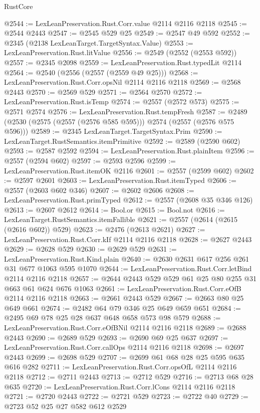 \begin{lexlean}{RustCore}
\begin{coremodule}
@2544 := LexLeanPreservation.Rust.Corr.value @2114 @2116 @2118
@2545 := @2544 @2443
@2547 := @2545 @529 @25
@2549 := @2547 @49 @592
@2552 := @2345 (@2138 LexLeanTarget.TargetSyntax.Value)
@2553 := LexLeanPreservation.Rust.litValue
@2556 := @2549 (@2552 (@2553 @592))
@2557 := @2345 @2098
@2559 := LexLeanPreservation.Rust.typedLit @2114
@2564 := @2540 (@2556 (@2557 (@2559 @49 @25)))
@2568 := LexLeanPreservation.Rust.Corr.opsNil @2114 @2116 @2118
@2569 := @2568 @2443
@2570 := @2569 @529
@2571 := @2564 @2570
@2572 := LexLeanPreservation.Rust.isTemp
@2574 := @2557 (@2572 @573)
@2575 := @2571 @2574
@2576 := LexLeanPreservation.Rust.tempFresh
@2587 := @2489 (@2530 (@2575 (@2557 (@2576 @585 @595))) @2574 (@2557 (@2576 @575 @596)))
@2589 := @2345 LexLeanTarget.TargetSyntax.Prim
@2590 := LexLeanTarget.RustSemantics.itemPrimitive
@2592 := @2589 (@2590 @602)
@2593 := @2587 @2592
@2594 := LexLeanPreservation.Rust.plainItem
@2596 := @2557 (@2594 @602)
@2597 := @2593 @2596
@2599 := LexLeanPreservation.Rust.itemOK @2116
@2601 := @2557 (@2599 @602)
@2602 := @2597 @2601
@2603 := LexLeanPreservation.Rust.itemTyped
@2606 := @2557 (@2603 @602 @346)
@2607 := @2602 @2606
@2608 := LexLeanPreservation.Rust.primTyped
@2612 := @2557 (@2608 @35 @346 @126)
@2613 := @2607 @2612
@2614 := Bool.or
@2615 := Bool.not
@2616 := LexLeanTarget.RustSemantics.itemFallible
@2621 := @2557 (@2614 (@2615 (@2616 @602)) @529)
@2623 := @2476 (@2613 @2621)
@2627 := LexLeanPreservation.Rust.Corr.kIf @2114 @2116 @2118
@2628 := @2627 @2443
@2629 := @2628 @529
@2630 := @2629 @529
@2631 := LexLeanPreservation.Rust.Kind.plain
@2640 := @2630 @2631 @617 @256 @261 @31 @677 @1063 @595 @1070
@2644 := LexLeanPreservation.Rust.Corr.letBind @2114 @2116 @2118
@2657 := @2644 @2443 @529 @529 @61 @25 @80 @255 @31 @663 @61 @624 @676 @1063
@2661 := LexLeanPreservation.Rust.Corr.eOfB @2114 @2116 @2118
@2663 := @2661 @2443 @529
@2667 := @2663 @80 @25 @649 @661
@2674 := @2482 @64 @79 @346 @25 @649 @659 @651
@2684 := @2495 @69 @78 @25 @28 @637 @648 @658 @573 @98 @579
@2688 := LexLeanPreservation.Rust.Corr.eOfBNil @2114 @2116 @2118
@2689 := @2688 @2443
@2690 := @2689 @529
@2693 := @2690 @69 @25 @637
@2697 := LexLeanPreservation.Rust.Corr.callOps @2114 @2116 @2118
@2698 := @2697 @2443
@2699 := @2698 @529
@2707 := @2699 @61 @68 @28 @25 @595 @635 @616 @282
@2711 := LexLeanPreservation.Rust.Corr.opsOfL @2114 @2116 @2118
@2712 := @2711 @2443
@2713 := @2712 @529
@2716 := @2713 @68 @28 @635
@2720 := LexLeanPreservation.Rust.Corr.lCons @2114 @2116 @2118
@2721 := @2720 @2443
@2722 := @2721 @529
@2723 := @2722 @40
@2729 := @2723 @52 @25 @27 @582 @612 @2529

\end{coremodule}
\end{lexlean}
